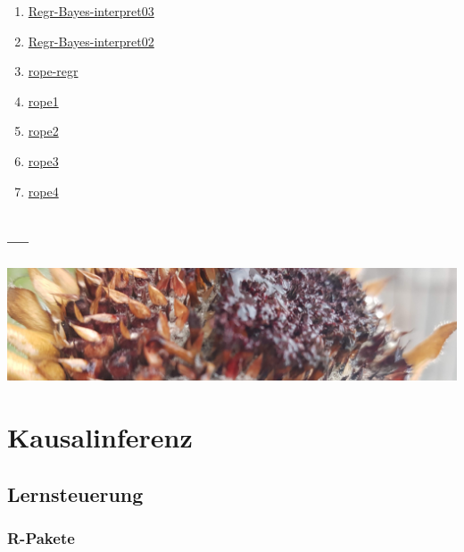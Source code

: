 \documentclass[
  a4paper,
  DIV=11]{scrreprt}
\theoremstyle{definition}
\theoremstyle{remark}
\begin{document}
\begin{enumerate}
\item
  \href{https://datenwerk.netlify.app/posts/regr-bayes-interpret03/regr-bayes-interpret03}{Regr-Bayes-interpret03}
\item
  \href{https://datenwerk.netlify.app/posts/regr-bayes-interpret03/regr-bayes-interpret02}{Regr-Bayes-interpret02}
\item
  \href{https://datenwerk.netlify.app/posts/rope-regr/rope-regr.html}{rope-regr}
\item
  \href{https://datenwerk.netlify.app/posts/rope1/rope1.html}{rope1}
\item
  \href{https://datenwerk.netlify.app/posts/rope2/rope2.html}{rope2}
\item
  \href{https://datenwerk.netlify.app/posts/rope3/rope3.html}{rope3}
\item
  \href{https://datenwerk.netlify.app/posts/rope4/rope4.html}{rope4}
\end{enumerate}

\hypertarget{section-9}{%
\section{---}\label{section-9}}

\includegraphics[width=1\textwidth,height=\textheight]{./img/outro-10.jpg}


\hypertarget{kausalinferenz}{%
\chapter{Kausalinferenz}\label{kausalinferenz}}

\hypertarget{lernsteuerung-9}{%
\section{Lernsteuerung}\label{lernsteuerung-9}}

\hypertarget{r-pakete-1}{%
\subsection{R-Pakete}\label{r-pakete-1}}
\end{document}
